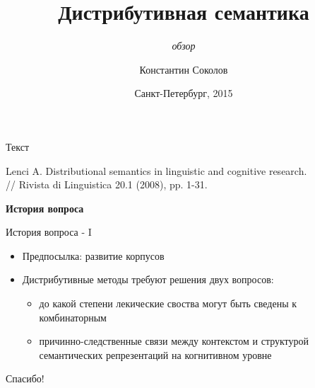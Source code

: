 \documentclass{beamer}
\begin{document}
\title{\Large{\sc Дистрибутивная семантика}}
\subtitle{\small{\textit{обзор}}}
\author{Константин Соколов}
\date{Санкт-Петербург, 2015} 

\begin{frame}
    \thispagestyle{empty}
    \titlepage
\end{frame}

\begin{frame}{Текст}
\setcounter{framenumber}{1}
\begin{center}
\small{Lenci A. Distributional semantics in linguistic and cognitive research.\\// Rivista di Linguistica 20.1 (2008), pp. 1-31.}
\end{center}
\end{frame}

\begin{frame}{}
\begin{center}
	\textbf{История вопроса}
\end{center}
\end{frame}

\iffalse
\begin{frame}{dsfsdf}
\begin{center}
	\begin{figure}[H]
		\texttt{[image: harmonic1.png]} 
	\end{figure}
\end{center}
\end{frame}
\fi

\begin{frame}{История вопроса - I}
\begin{itemize}
	\item Предпосылка: развитие корпусов
	\item Дистрибутивные методы требуют решения двух вопросов:
		\begin{itemize}
		    \item до какой степени лекические своства могут быть сведены к комбинаторным
		    \item причинно-следственные связи между контекстом и структурой семантических репрезентаций на когнитивном уровне
		\end{itemize}
\end{itemize}
\end{frame}


\begin{frame}{}
    \thispagestyle{empty}
    \begin{center}
        {\large Спасибо!}
    \end{center}
\end{frame}
\end{document}

